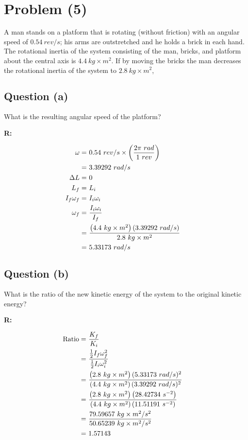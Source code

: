 \section{Problem (5)}
	A man stands on a platform that is rotating (without friction) with an angular speed of $0.54 \ rev/s$; his arms are outstretched and he holds a brick in each hand. The rotational inertia of the system consisting of the man, bricks, and platform about the central axis is $4.4 \ kg \times m^{2}$. If by moving the bricks the man decreases the rotational inertia of the system to $2.8 \ kg \times m^{2}$,

	\subsection{Question (a)}

		What is the resulting angular speed of the platform?

		\textbf{R:}

		\begin{align}
			\omega = \ &0.54 \ rev/s
			\times \left( \frac{2 \pi \ rad}{1 \ rev} \right)& \notag \\
			= \ &3.39292 \ rad/s& \notag \\
			\Delta L = \ &0& \notag \\
			L_{f} = \ &L_{i}& \notag \\
			I_{f}\omega_{f} = \ &I_{i}\omega_{i}& \notag \\
			\omega_{f} = \ &\frac{I_{i}\omega_{i}}{I_{f}}& \notag \\
			= \ &\frac{\left(4.4 \ kg \times m^{2}\right)(3.39292 \ rad/s)}{2.8 \ kg \times m^{2}}& \notag \\
			= \ &5.33173 \ rad/s&
		\end{align}

	\subsection{Question (b)}

		What is the ratio of the new kinetic energy of the system to the original kinetic energy?

		\textbf{R:}

		\begin{align}
			\text{Ratio} = \ &\frac{K_{f}}{K_{i}}& \notag \\
			= \ &\frac{\frac{1}{2} I_{f}\omega_{f}^{2}}{\frac{1}{2} I_{i}\omega_{i}^{2}}& \notag \\
			= \ &\frac{\left(2.8 \ kg \times m^{2}\right)(5.33173 \ rad/s)^{2}}{\left(4.4 \ kg \times m^{2}\right)(3.39292 \ rad/s)^{2}}& \notag \\
			= \ &\frac{\left(2.8 \ kg \times m^{2}\right)\left(28.42734 \ s^{-2}\right)}{\left(4.4 \ kg \times m^{2}\right)\left(11.51191 \ s^{-2}\right)}& \notag \\
			= \ &\frac{79.59657 \ kg \times m^{2}/s^{2}}{50.65239 \ kg \times m^{2}/s^{2}}& \notag \\
			= \ &1.57143&
		\end{align}
